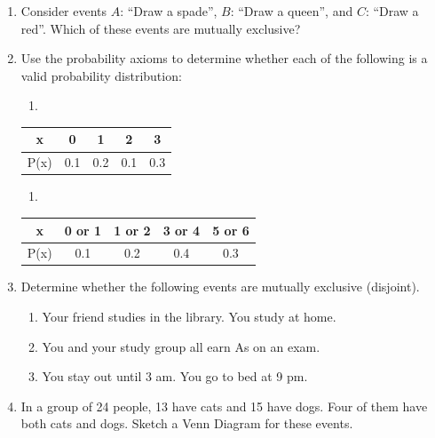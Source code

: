 \documentclass[
]{book}
\providecommand{\tightlist}{%
  \setlength{\itemsep}{0pt}\setlength{\parskip}{0pt}}
\begin{document}
\begin{enumerate}
\def\labelenumi{\arabic{enumi}.}
\tightlist
\item
  Consider events \(A\): ``Draw a spade'', \(B\): ``Draw a queen'', and \(C\): ``Draw a red''. Which of these events are mutually exclusive?
\item
  Use the probability axioms to determine whether each of the following is a valid probability distribution:

  \begin{enumerate}
  \def\labelenumii{\Alph{enumii}.}
  \tightlist
  \item
  \end{enumerate}

  \begin{longtable}[]{@{}ccccc@{}}
  \toprule\noalign{}
  x & 0 & 1 & 2 & 3 \\
  \midrule\noalign{}
  \endhead
  \bottomrule\noalign{}
  \endlastfoot
  P(x) & 0.1 & 0.2 & 0.1 & 0.3 \\
  \end{longtable}

  \begin{enumerate}
  \def\labelenumii{\Alph{enumii}.}
  \setcounter{enumii}{1}
  \tightlist
  \item
  \end{enumerate}

  \begin{longtable}[]{@{}ccccc@{}}
  \toprule\noalign{}
  x & 0 or 1 & 1 or 2 & 3 or 4 & 5 or 6 \\
  \midrule\noalign{}
  \endhead
  \bottomrule\noalign{}
  \endlastfoot
  P(x) & 0.1 & 0.2 & 0.4 & 0.3 \\
  \end{longtable}
\item
  Determine whether the following events are mutually exclusive (disjoint).

  \begin{enumerate}
  \def\labelenumii{\alph{enumii}.}
  \tightlist
  \item
    Your friend studies in the library. You study at home.
  \item
    You and your study group all earn As on an exam.
  \item
    You stay out until 3 am. You go to bed at 9 pm.
  \end{enumerate}
\item
  In a group of 24 people, 13 have cats and 15 have dogs. Four of them have both cats and dogs. Sketch a Venn Diagram for these events.
\end{enumerate}
\end{document}
